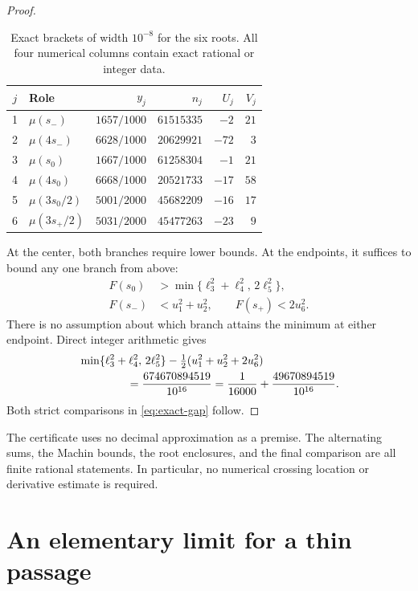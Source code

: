 \documentclass[11pt,a4paper]{article}
\theoremstyle{definition}\newtheorem{definition}[theorem]{Definition}
\theoremstyle{remark}\newtheorem{remark}[theorem]{Remark}
\begin{document}
\begin{proof}
\begin{table}[ht]
\centering
\caption{Exact brackets of width $10^{-8}$ for the six roots.
All four numerical columns contain exact rational or integer data.}
\label{tab:roots}
\begin{tabular}{clrrrr}
\toprule
$j$ & Role & $y_j$ & $n_j$ & $U_j$ & $V_j$\\
\midrule
1 & $\mu(s_-)$ & $1657/1000$ & $61515335$ & $-2$ & $21$\\
2 & $\mu(4s_-)$ & $6628/1000$ & $20629921$ & $-72$ & $3$\\
3 & $\mu(s_0)$ & $1667/1000$ & $61258304$ & $-1$ & $21$\\
4 & $\mu(4s_0)$ & $6668/1000$ & $20521733$ & $-17$ & $58$\\
5 & $\mu(3s_0/2)$ & $5001/2000$ & $45682209$ & $-16$ & $17$\\
6 & $\mu(3s_+/2)$ & $5031/2000$ & $45477263$ & $-23$ & $9$\\
\bottomrule
\end{tabular}
\end{table}

At the center, both branches require lower bounds. At the
endpoints, it suffices to bound any one branch from above:
\begin{align*}
 F(s_0)&>\min\{\ell_3^2+\ell_4^2,\,2\ell_5^2\},\\
 F(s_-)&<u_1^2+u_2^2,\qquad
 F(s_+)<2u_6^2.
\end{align*}
There is no assumption about which branch attains the minimum
at either endpoint. Direct integer arithmetic gives
\begin{align*}
 &\min\{\ell_3^2+\ell_4^2,\,2\ell_5^2\}
     -\tfrac12(u_1^2+u_2^2+2u_6^2)\\
 &\hspace{15mm}=\frac{674670894519}{10^{16}}
 =\frac1{16000}+\frac{49670894519}{10^{16}}.
\end{align*}
Both strict comparisons in \eqref{eq:exact-gap} follow.
\end{proof}

The certificate uses no decimal approximation as a premise.
The alternating sums, the Machin bounds, the root enclosures,
and the final comparison are all finite rational statements.
In particular, no numerical crossing location or derivative
estimate is required.

\section{An elementary limit for a thin passage}
\label{sec:neck}
\end{document}

